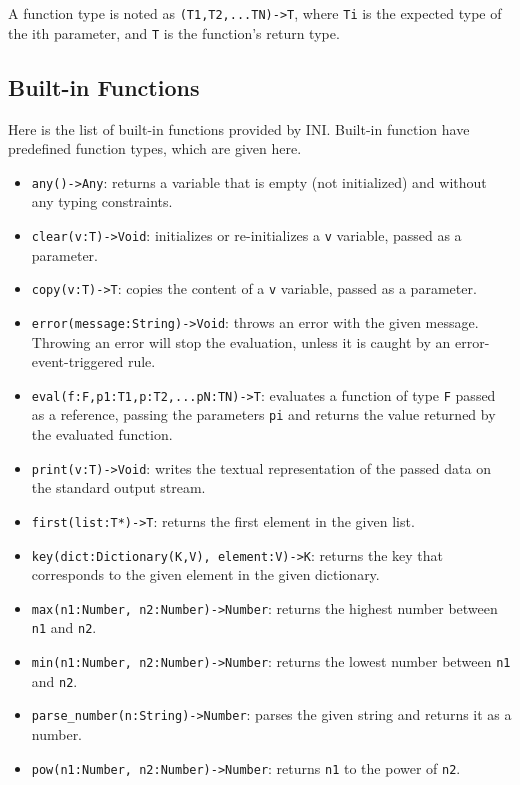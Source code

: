 \documentclass[11pt]{report}
\begin{document}
A function type is noted as \texttt{(T1,T2,...TN)->T}, where \texttt{Ti} is the expected type of the ith parameter, and \texttt{T} is the function's return type.

\subsection{Built-in Functions\label{sec:built_in_functions} }

Here is the list of built-in functions provided by INI. Built-in function have predefined function types, which are given here.

\begin{itemize}
\item \texttt{any()->Any}: returns a variable that is empty (not initialized) and without any typing constraints.
\item \texttt{clear(v:T)->Void}: initializes or re-initializes a \texttt{v} variable, passed as a parameter.
\item \texttt{copy(v:T)->T}: copies the content of a \texttt{v} variable, passed as a parameter.
\item \texttt{error(message:String)->Void}: throws an error with the given message. Throwing an error will stop the evaluation, unless it is caught by an error-event-triggered rule.
\item \texttt{eval(f:F,p1:T1,p:T2,...pN:TN)->T}: evaluates a function of type \texttt{F} passed as a reference, passing the parameters \texttt{pi} and returns the value returned by the evaluated function.
\item \texttt{print(v:T)->Void}: writes the textual representation of the passed data on the standard output stream.
\item \texttt{first(list:T*)->T}: returns the first element in the given list.
\item \texttt{key(dict:Dictionary(K,V), element:V)->K}: returns the key that corresponds to the given element in the given dictionary.
\item \texttt{max(n1:Number, n2:Number)->Number}: returns the highest number between \texttt{n1} and \texttt{n2}.
\item \texttt{min(n1:Number, n2:Number)->Number}: returns the lowest number between \texttt{n1} and \texttt{n2}.
\item \texttt{parse\_number(n:String)->Number}: parses the given string and returns it as a number.
\item \texttt{pow(n1:Number, n2:Number)->Number}: returns \texttt{n1} to the power of \texttt{n2}.

\end{itemize}
\end{document}

